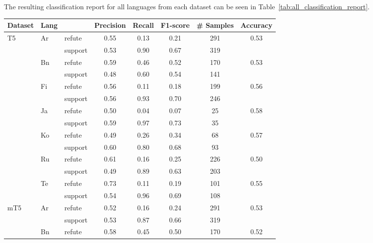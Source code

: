 The resulting classification report for all languages from each dataset can be seen in Table~\ref{tab:all_classification_report}.

\begin{table}[H]
    \centering
    \begin{tabular}{l|llccccc}
        \hline
        Dataset & Lang &  & Precision & Recall & F1-score & \# Samples & Accuracy \\
        \hline
        \multirow{14}{*}{T5} & \multirow{2}{*}{Ar} & refute & 0.55 & 0.13 & 0.21 & 291 & \multirow{2}{*}{0.53} \\
         & & support & 0.53 & 0.90 & 0.67 & 319 &  \\
        \cline{2-8}
         & \multirow{2}{*}{Bn} & refute & 0.59 & 0.46 & 0.52 & 170 & \multirow{2}{*}{0.53} \\
         & & support & 0.48 & 0.60 & 0.54 & 141 &  \\
        \cline{2-8}
         & \multirow{2}{*}{Fi} & refute & 0.56 & 0.11 & 0.18 & 199 & \multirow{2}{*}{0.56} \\
         & & support & 0.56 & 0.93 & 0.70 & 246 &  \\
        \cline{2-8}
         & \multirow{2}{*}{Ja} & refute & 0.50 & 0.04 & 0.07 & 25 & \multirow{2}{*}{0.58} \\
         & & support & 0.59 & 0.97 & 0.73 & 35 &  \\
        \cline{2-8}
         & \multirow{2}{*}{Ko} & refute & 0.49 & 0.26 & 0.34 & 68 & \multirow{2}{*}{0.57} \\
         & & support & 0.60 & 0.80 & 0.68 & 93 &  \\
        \cline{2-8}
         & \multirow{2}{*}{Ru} & refute & 0.61 & 0.16 & 0.25 & 226 & \multirow{2}{*}{0.50} \\
         & & support & 0.49 & 0.89 & 0.63 & 203 &  \\
        \cline{2-8}
         & \multirow{2}{*}{Te} & refute & 0.73 & 0.11 & 0.19 & 101 & \multirow{2}{*}{0.55} \\
         & & support & 0.54 & 0.96 & 0.69 & 108 &  \\
        \hline
        \hline
        \multirow{14}{*}{mT5} & \multirow{2}{*}{Ar} & refute & 0.52 & 0.16 & 0.24 & 291 & \multirow{2}{*}{0.53} \\
         & & support & 0.53 & 0.87 & 0.66 & 319 &  \\
        \cline{2-8}
         & \multirow{2}{*}{Bn} & refute & 0.58 & 0.45 & 0.50 & 170 & \multirow{2}{*}{0.52} \\

\end{tabular}
\end{table}
